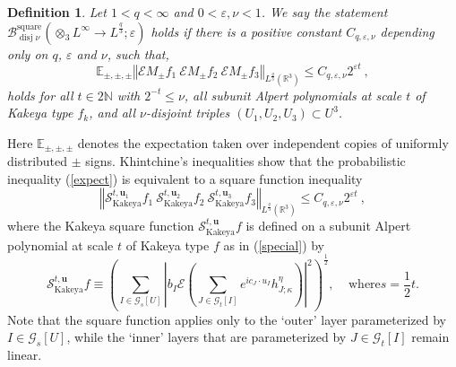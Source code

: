 \documentclass{amsart}%
\theoremstyle{plain}
\newtheorem{definition}[theorem]{Definition}
\numberwithin{equation}{section}
\begin{document}
\begin{definition}
\label{def B}Let $1<q<\infty$ and $0<\varepsilon,\nu<1$. We say the statement
$\mathcal{B}_{\operatorname*{disj}\nu}^{\operatorname*{square}}\left(
\otimes_{3}L^{\infty}\rightarrow L^{\frac{q}{3}};\varepsilon\right)  $ holds
if there is a positive constant $C_{q,\varepsilon,\nu}$ depending only on $q$,
$\varepsilon$ and $\nu$, such that,%
\begin{equation}
\mathbb{E}_{\pm,\pm,\pm}\left\Vert \mathcal{E}M_{\pm}f_{1}\ \mathcal{E}M_{\pm
}f_{2}\ \mathcal{E}M_{\pm}f_{3}\right\Vert _{L^{\frac{q}{3}}\left(
\mathbb{R}^{3}\right)  }\leq C_{q,\varepsilon,\nu}2^{\varepsilon
t}\ ,\label{expect}%
\end{equation}
holds for all $t\in2\mathbb{N}$ with $2^{-t}\leq\nu$, all subunit Alpert
polynomials at scale $t$ of Kakeya type $f_{k}$, and all $\nu$-disjoint
triples $\left(  U_{1},U_{2},U_{3}\right)  \subset U^{3}$.
\end{definition}

Here $\mathbb{E}_{\pm,\pm,\pm}$ denotes the expectation taken over independent
copies of uniformly distributed $\pm$ signs. Khintchine's inequalities show
that the probabilistic inequality (\ref{expect}) is equivalent to a square
function inequality%
\begin{equation}
\left\Vert \mathcal{S}_{\operatorname{Kakeya}}^{t,\mathbf{u}_{1}}%
f_{1}\ \mathcal{S}_{\operatorname{Kakeya}}^{t,\mathbf{u}_{2}}f_{2}%
\ \mathcal{S}_{\operatorname{Kakeya}}^{t,\mathbf{u}_{3}}f_{3}\right\Vert
_{L^{\frac{q}{3}}\left(  \mathbb{R}^{3}\right)  }\leq C_{q,\varepsilon,\nu
}2^{\varepsilon t}\ ,\label{Kak square equiv}%
\end{equation}
where the Kakeya square function $\mathcal{S}_{\operatorname{Kakeya}%
}^{t,\mathbf{u}}f $ is defined on a subunit Alpert polynomial at scale $t$ of
Kakeya type $f$ as in (\ref{special}) by%
\begin{equation}
\mathcal{S}_{\operatorname{Kakeya}}^{t,\mathbf{u}}f\equiv\left(  \sum
_{I\in\mathcal{G}_{s}\left[  U\right]  }\left\vert b_{I}\mathcal{E}\left(
\sum_{J\in\mathcal{G}_{t}\left[  I\right]  }e^{ic_{J}\cdot u_{I}}h_{J;\kappa
}^{\eta}\right)  \right\vert ^{2}\right)  ^{\frac{1}{2}},\ \ \ \ \ \text{where
}s=\frac{1}{2}t.\label{Kakeya square}%
\end{equation}
Note that the square function applies only to the `outer' layer parameterized
by $I\in\mathcal{G}_{s}\left[  U\right]  $, while the `inner' layers that are
parameterized by $J\in\mathcal{G}_{t}\left[  I\right]  $ remain linear.
\end{document}
